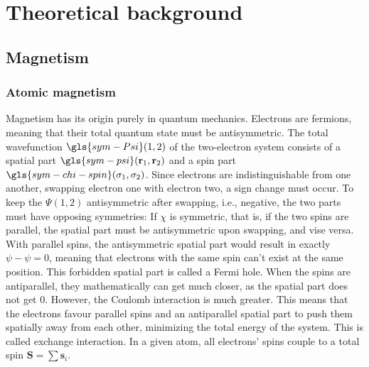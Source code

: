 \chapter{Theoretical background} \label{sec:theorie}
\section{Magnetism}\label{sec:theory_magnetism}
\subsection{Atomic magnetism}\label{sec:theory_atomic_magnetism}
Magnetism has its origin purely in quantum mechanics.
Electrons are fermions, meaning that their total quantum state must be antisymmetric.
The total wavefunction $\gls{sym-Psi}(1,2)$ of the two-electron system consists of a spatial part $\gls{sym-psi}(\mathbf{r}_1,\mathbf{r}_2)$ and a spin part $\gls{sym-chi-spin}(\sigma_1,\sigma_2)$.
Since electrons are indistinguishable from one another, swapping electron one with electron two, a sign change must occur. 
To keep the $\Psi(1,2)$ antisymmetric after swapping, i.e., negative, the two parts must have opposing symmetries:
If $\chi$ is symmetric, that is, if the two spins are parallel, the spatial part must be antisymmetric upon swapping, and vise versa. 
With parallel spins, the antisymmetric spatial part would result in exactly $\psi-\psi=0$, meaning that electrons with the same spin can't exist at the same position.
This forbidden spatial part is called a Fermi hole.
When the spins are antiparallel, they mathematically can get much closer, as the spatial part does not get 0.
However, the Coulomb interaction is much greater.
This means that the electrons favour parallel spins and an antiparallel spatial part to push them spatially away from each other, minimizing the total energy of the system.
This is called exchange interaction.
In a given atom, all electrons' spins couple to a total spin $\mathbf{S} = \sum \mathbf{s}_i$.

